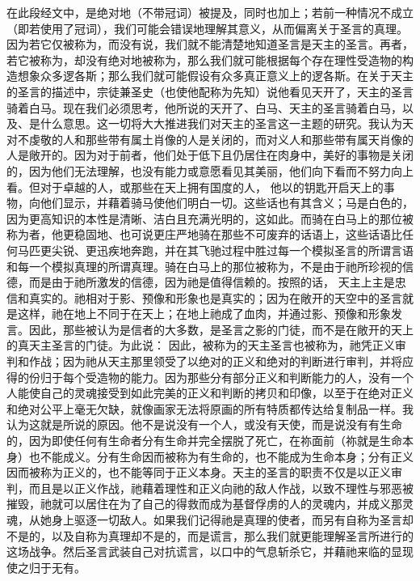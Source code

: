 在此段经文中，是绝对地（不带冠词）被提及，同时也加上；若前一种情况不成立（即若使用了冠词），我们可能会错误地理解其意义，从而偏离关于圣言的真理。因为若它仅被称为，而没有说，我们就不能清楚地知道圣言是天主的圣言。再者，若它被称为，却没有绝对地被称为，那么我们就可能根据每个存在理性受造物的构造想象众多逻各斯；那么我们就可能假设有众多真正意义上的逻各斯。在关于天主的圣言的描述中，宗徒兼圣史（也使他配称为先知）说他看见天开了，天主的圣言骑着白马。现在我们必须思考，他所说的天开了、白马、天主的圣言骑着白马，以及、是什么意思。这一切将大大推进我们对天主的圣言这一主题的研究。我认为天对不虔敬的人和那些带有属土肖像的人是关闭的，而对义人和那些带有属天肖像的人是敞开的。因为对于前者，他们处于低下且仍居住在肉身中，美好的事物是关闭的，因为他们无法理解，也没有能力或意愿看见其美丽，他们向下看而不努力向上看。但对于卓越的人，或那些在天上拥有国度的人， 他以的钥匙开启天上的事物，向他们显示，并藉着骑马使他们明白一切。这些话也有其含义；马是白色的，因为更高知识的本性是清晰、洁白且充满光明的，这如此。而骑在白马上的那位被称为者，他更稳固地、也可说更庄严地骑在那些不可废弃的话语上，这些话语比任何马匹更尖锐、更迅疾地奔跑，并在其飞驰过程中胜过每一个模拟圣言的所谓言语和每一个模拟真理的所谓真理。骑在白马上的那位被称为，不是由于祂所珍视的信德，而是由于祂所激发的信德，因为祂是值得信赖的。按照的话， 天主上主是忠信和真实的。祂相对于影、预像和形象也是真实的；因为在敞开的天空中的圣言就是这样，祂在地上不同于在天上；在地上祂成了血肉，并通过影、预像和形象发言。因此，那些被认为是信者的大多数，是圣言之影的门徒，而不是在敞开的天上的真天主圣言的门徒。为此说：  因此，被称为的天主圣言也被称为，祂凭正义审判和作战；因为祂从天主那里领受了以绝对的正义和绝对的判断进行审判，并将应得的份归于每个受造物的能力。因为那些分有部分正义和判断能力的人，没有一个人能使自己的灵魂接受到如此完美的正义和判断的拷贝和印像，以至于在绝对正义和绝对公平上毫无欠缺，就像画家无法将原画的所有特质都传达给复制品一样。我认为这就是所说的原因。他不是说没有一个人，或没有天使，而是说没有有生命的，因为即使任何有生命者分有生命并完全摆脱了死亡，在祢面前（祢就是生命本身）也不能成义。分有生命因而被称为有生命的，也不能成为生命本身；分有正义因而被称为正义的，也不能等同于正义本身。天主的圣言的职责不仅是以正义审判，而且是以正义作战，祂藉着理性和正义向祂的敌人作战，以致不理性与邪恶被摧毁，祂就可以居住在为了自己的得救而成为基督俘虏的人的灵魂内，并成义那灵魂，从她身上驱逐一切敌人。如果我们记得祂是真理的使者，而另有自称为圣言却不是的，以及自称为真理却不是的，而是谎言，那么我们就更能理解圣言所进行的这场战争。然后圣言武装自己对抗谎言，以口中的气息斩杀它，并藉祂来临的显现使之归于无有。 